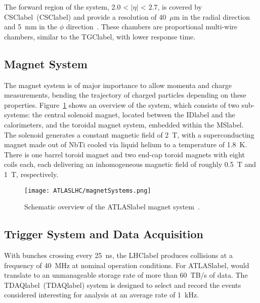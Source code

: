 The forward region of the system, 2.0 < $|\eta|$ < 2.7, is covered by \acrlong{CSClabel}~(\acrshort{CSClabel}) and provide a resolution of 40~$\mu$m in the radial direction and 5~mm in the $\phi$ direction~\cite{Collaboration_2008}. These chambers are proportional multi-wire chambers, similar to the \acrshort{TGClabel}, with lower response time.

\subsection{Magnet System}

The magnet system is of major importance to allow momenta and charge measurements, bending the trajectory of charged particles depending on these properties. Figure~\ref{figLHC:ATLASMagnets} shows an overview of the system, which consists of two sub-systems: the central solenoid magnet, located between the \acrshort{IDlabel} and the calorimeters, and the toroidal magnet system, embedded within the \acrshort{MSlabel}.\\

The solenoid generates a constant magnetic field of 2~T, with a superconducting magnet made out of NbTi cooled via liquid helium to a temperature of 1.8~K. There is one barrel toroid magnet and two end-cap toroid magnets with eight coils each, each delivering an inhomogeneous magnetic field of roughly 0.5~T and 1~T, respectively.

\begin{figure}[htbp]
    \RawFloats
    \begin{center}
    \texttt{[image: ATLASLHC/magnetSystems.png]}
    \caption{
        Schematic overview of the \acrshort{ATLASlabel} magnet system~\cite{JetGoodson}. 
    }
    \label{figLHC:ATLASMagnets}
    \end{center}
\end{figure}

\subsection{Trigger System and Data Acquisition}

With bunches crossing every 25~ns, the \acrshort{LHClabel} produces collisions at a frequency of 40~MHz at nominal operation conditions. For \acrshort{ATLASlabel}, would translate to an unmanageable storage rate of more than 60~TB/s of data. The \acrlong{TDAQlabel}~(\acrshort{TDAQlabel}) system is designed to select and record the events considered interesting for analysis at an average rate of 1~kHz.\\


